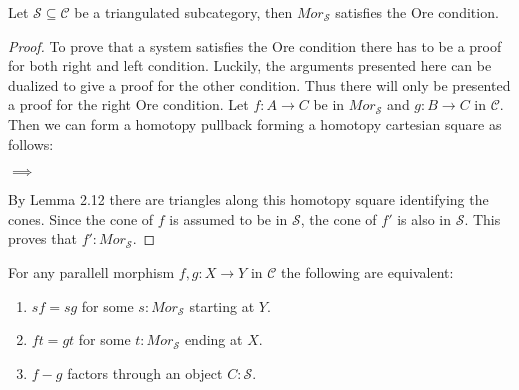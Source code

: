     \begin{prop}
        Let $\mathcal{S}\subseteq\mathcal{C}$ be a triangulated subcategory, then $Mor_\mathcal{S}$ satisfies the Ore condition.
    \end{prop}

    \begin{proof}
        To prove that a system satisfies the Ore condition there has to be a proof for both right and left condition. Luckily, the arguments presented here can be dualized to give a proof for the other condition. Thus there will only be presented a proof for the right Ore condition.
        Let $f:A\rightarrow C$ be in $Mor_\mathcal{S}$ and $g:B\rightarrow C$ in $\mathcal{C}$. Then we can form a homotopy pullback forming a homotopy cartesian square as follows:
        \begin{center}
            $\implies$
        \end{center}
        By Lemma 2.12 there are triangles along this homotopy square identifying the cones. Since the cone of $f$ is assumed to be in $\mathcal{S}$, the cone of $f'$ is also in $\mathcal{S}$. This proves that $f':Mor_\mathcal{S}$.
    \end{proof}

    \begin{prop}
        For any parallell morphism $f,g:X\rightarrow Y$ in $\mathcal{C}$ the following are equivalent:
        \begin{enumerate}
            \item $sf=sg$ for some $s:Mor_\mathcal{S}$ starting at $Y$.
            \item $ft=gt$ for some $t:Mor_\mathcal{S}$ ending at $X$.
            \item $f-g$ factors through an object $C:\mathcal{S}$.
        \end{enumerate}
    \end{prop}

